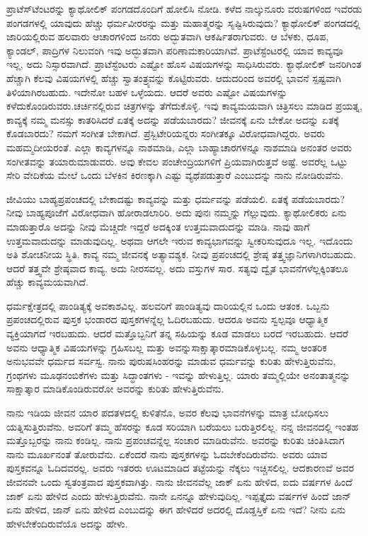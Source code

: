 ಪ್ರಾಟೆಸ್‌ಟೆಂಟರನ್ನು ಕ್ಯಾಥೋಲಿಕ್ ಪಂಗಡದೊಂದಿಗೆ ಹೋಲಿಸಿ ನೋಡಿ. ಕಳೆದ ನಾಲ್ಕುನೂರು ವರುಷಗಳಿಂದ ಇವೆರಡು ಪಂಗಡಗಳಲ್ಲಿ ಯಾವುದು ಹೆಚ್ಚು ಧರ್ಮವೀರರನ್ನು ಮತ್ತು ಮಹಾತ್ಮರನ್ನು ಸೃಷ್ಟಿಸಿರುವುದು? ಕ್ಯಾಥೋಲಿಕ್ ಪಂಗಡದಲ್ಲಿ ಜಾರಿಯಲ್ಲಿರುವ ಹಲವಾರು ಆಚಾರಗಳಿಂದ ಜನರು ಅದ್ಭುತವಾಗಿ ಆಕರ್ಷಿತರಾಗುವರು. ಆ ಬೆಳಕು, ಧೂಪ, ಕ್ಯಾಂಡಲ್, ಪಾದ್ರಿಗಳ ನಿಲುವಂಗಿ ಇವು ಅದ್ಭುತವಾಗಿ ಪರಿಣಾಮಕಾರಿಯಾಗಿವೆ. ಪ್ರಾಟೆಸ್ಟೆಂಟರಲ್ಲಿ ಯಾವ ಕಾವ್ಯವೂ ಇಲ್ಲ, ಅದು ನಿಸ್ಸಾರವಾಗಿದೆ. ಪ್ರಾಟೆಸ್ಟೆಂಟರು ಎಷ್ಟೋ ಹೊಸ ವಿಷಯಗಳನ್ನು ಸಾಧಿಸಿರುವರು. ಕ್ಯಾಥೋಲಿಕ್ ಜನರಿಗಿಂತ ಹೆಚ್ಚಾಗಿ ಕೆಲವು ವಿಷಯಗಳಲ್ಲಿ ಹೆಚ್ಚು ಸ್ವಾತಂತ್ರ್ಯವನ್ನು ಕೊಟ್ಟಿರುವರು. ಆದುದರಿಂದ ಅವರಲ್ಲಿ ಭಾವನೆ ಸ್ಪಷ್ಟವಾಗಿ ತಿಳಿಯಾಗಿರಬಹುದು. ಇದೇನೋ ಬಹಳ ಒಳ್ಳೆಯದು. ಆದರೆ ಅವರು ಎಷ್ಟೋ ವಿಷಯಗಳನ್ನು ಕಳೆದುಕೊಂಡಿರುವರು.\break ಚರ್ಚಿನಲ್ಲಿರುವ ಚಿತ್ರಗಳನ್ನು ತೆಗೆದುಕೊಳ್ಳಿ. ಇವು ಕಾವ್ಯಮಯವಾಗಿ ಚಿತ್ರಿಸಲು ಮಾಡಿದ ಪ್ರಯತ್ನ, ಕಾವ್ಯಕ್ಕೆ ನಮ್ಮ ಮನಸ್ಸು ಕಾತರಿಸಿದರೆ ಏತಕ್ಕೆ ಅದನ್ನು ಪಡೆಯಬಾರದು? ಜೀವನಕ್ಕೆ ಏನು ಬೇಕೋ ಅದನ್ನು ಏತಕ್ಕೆ ಕೊಡಬಾರದು? ನಮಗೆ ಸಂಗೀತ ಬೇಕಾಗಿದೆ. ಪ್ರೆಸ್ಬಿಟೇರಿಯನ್ನರು ಸಂಗೀತಕ್ಕೂ ವಿರೋಧವಾಗಿದ್ದರು. ಅವರು ಮಹಮ್ಮದೀಯರಂತೆ. ಎಲ್ಲಾ ಕಾವ್ಯಗಳನ್ನೂ ನಾಶಮಾಡಿ, ಎಲ್ಲಾ ಬಾಹ್ಯಾಚಾರಗಳನ್ನೂ ನಾಶಮಾಡಿ ಅನಂತರ ಅವರು ಸಂಗೀತವನ್ನು ತಯಾರುಮಾಡುವರು. ಅವು ಕೇವಲ ಪಂಚೇಂದ್ರಿಯಗಳಿಗೆ ಪ್ರಿಯವಾಗಿರುತ್ತವೆ ಅಷ್ಟೆ. ಅವರೆಲ್ಲ ಒಟ್ಟು ಸೇರಿ ವೇದಿಕೆಯ ಮೇಲೆ ಒಂದು ಬೆಳಕಿನ ಕಿರಣಕ್ಕಾಗಿ ಎಷ್ಟು ವ್ಯಥೆಪಡುತ್ತಾರೆ ಎಂಬುದನ್ನು ನಾನು ನೋಡಿರುವೆನು.

ಜೀವಿಯು ಬಾಹ್ಯಪ್ರಪಂಚದಲ್ಲಿ ಬೇಕಾದಷ್ಟು ಕಾವ್ಯವನ್ನು ಮತ್ತು ಧರ್ಮವನ್ನು ಪಡೆಯಲಿ. ಏತಕ್ಕೆ ಪಡೆಯಬಾರದು? ನೀವು ಬಾಹ್ಯಪೂಜೆಗೆ ವಿರೋಧವಾಗಿ ಹೋರಾಡಲಾರಿರಿ. ಅದು ಪುನಃ ನಮ್ಮನ್ನು ಗೆಲ್ಲುವುದು. ಕ್ಯಾಥೋಲಿಕರು ಏನು ಮಾಡುತ್ತಾರೊ ಅದನ್ನು ನೀವು ಮೆಚ್ಚದೇ ಇದ್ದರೆ ಅದಕ್ಕಿಂತ ಉತ್ತಮವಾದುದನ್ನು ಮಾಡಿ. ನಾವು ಹಾಗೆ ಉತ್ತಮವಾದುದನ್ನು ಮಾಡುವುದಿಲ್ಲ. ಅಥವಾ ಆಗಲೇ ಇರುವ ಕಾವ್ಯಭಾಗವನ್ನು ಸ್ವೀಕರಿಸುವುದೂ ಇಲ್ಲ. ಇದೊಂದು ಅತಿ ಶೋಚನೀಯ ಸ್ಥಿತಿ. ಕಾವ್ಯ ನಮ್ಮ ಜೀವನಕ್ಕೆ ಅತ್ಯಾವಶ್ಯಕ. ನೀವು ಪ್ರಪಂಚದಲ್ಲಿ ಶ್ರೇಷ್ಠ ತತ್ತ್ವಜ್ಞಾನಿಗಳಾಗಿರಬಹುದು. ಆದರೆ ತತ್ತ್ವವೇ ಶ್ರೇಷ್ಠವಾದ ಕಾವ್ಯ. ಅದು ನೀರಸವಲ್ಲ. ಅದು ವಸ್ತುಗಳ ಸಾರ. ಸತ್ಯವು ದ್ವೈತ ಭಾವನೆಗಳೆಲ್ಲಕ್ಕಿಂತಲೂ ಹೆಚ್ಚು ಕಾವ್ಯಮಯವಾಗಿದೆ.

ಧರ್ಮಕ್ಷೇತ್ರದಲ್ಲಿ ಪಾಂಡಿತ್ಯಕ್ಕೆ ಅವಕಾಶವಿಲ್ಲ. ಹಲವರಿಗೆ ಪಾಂಡಿತ್ಯವು ದಾರಿಯಲ್ಲಿನ ಒಂದು ಆತಂಕ. ಒಬ್ಬನು ಪ್ರಪಂಚದಲ್ಲಿರುವ ಪುಸ್ತಕ ಭಂಡಾರದ ಪುಸ್ತಕಗಳನ್ನೆಲ್ಲ ಓದಿರಬಹುದು. ಆದರೂ ಅವನು ಸ್ವಲ್ಪವೂ ಆಧ್ಯಾತ್ಮಿಕ ವ್ಯಕ್ತಿಯಾಗದೆ ಇರಬಹುದು. ಆದರೆ ಮತ್ತೊಬ್ಬನಿಗೆ ತನ್ನ ಸಹಿಯನ್ನು ಕೂಡ ಮಾಡಲು ಬರದೆ ಇರಬಹುದು. ಆದರೆ ಅವನು ಆಧ್ಯಾತ್ಮಿಕ ವಿಷಯಗಳನ್ನು ಗ್ರಹಿಸಬಲ್ಲ ಮತ್ತು ಅವನ್ನು\break ಸಾಕ್ಷಾತ್ಕಾರಮಾಡಿಕೊಳ್ಳಬಲ್ಲ. ನಮ್ಮ ಆಂತರಿಕ ಅನುಭವವೇ ಧರ್ಮದ ಸರ್ವಸ್ವ. ನಾನು ಪುರುಷಸಿಂಹರನ್ನು ಮಾಡುವ ಧರ್ಮವನ್ನು ಕುರಿತು ಹೇಳುತ್ತಿರುವೆನು, ಗ್ರಂಥಗಳು ಮೂಢನಂಬಿಕೆಗಳು ಮತ್ತು ಸಿದ್ಧಾಂತಗಳು - ಇವನ್ನು ಹೇಳುತ್ತಿಲ್ಲ. ಯಾರು ತಮ್ಮಲ್ಲಿಯೇ ಅನಂತಾತ್ಮನನ್ನು ಸಾಕ್ಷಾತ್ಕಾರ ಮಾಡಿಕೊಂಡಿರುವರೋ ಅವರನ್ನು ಕುರಿತು ಹೇಳುತ್ತಿರುವೆನು.

ನಾನು ಇಡಿಯ ಜೀವನ ಯಾರ ಪದತಳದಲ್ಲಿ ಕುಳಿತೆನೊ, ಅವರ ಕೆಲವು ಭಾವನೆಗಳನ್ನು ಮಾತ್ರ ಬೋಧಿಸಲು ಯತ್ನಿಸುತ್ತಿರುವೆನು. ಅವರಿಗೆ ತಮ್ಮ ಹೆಸರನ್ನು ಕೂಡ ಸರಿಯಾಗಿ ಬರೆಯಲು ಬರುತ್ತಿರಲಿಲ್ಲ. ನನ್ನ ಜೀವನದಲ್ಲಿ ಇಂತಹ ಮತ್ತೊಬ್ಬರನ್ನು ನಾನು ಕಂಡಿಲ್ಲ. ನಾನು ಪ್ರಪಂಚವನ್ನೆಲ್ಲ ಸಂಚಾರ ಮಾಡಿರುವೆನು. ಅವರನ್ನು ಕುರಿತು ಚಿಂತಿಸಿದಾಗ ನಾನು ಮೂರ್ಖನಂತೆ ತೋರುವೆನು. ಏಕೆಂದರೆ ನಾನು ಪುಸ್ತಕಗಳನ್ನು ಓದಬೇಕೆಂದಿರುವೆನು. ಅವರು ಯಾವ ಪುಸ್ತಕವನ್ನೂ ಓದಿದವರಲ್ಲ. ಅವರು ಇತರರು ಊಟಮಾಡಿದ ತಟ್ಟೆಯನ್ನು ನೆಕ್ಕಲು ಇಚ್ಚಿಸಲಿಲ್ಲ. ಆದಕಾರಣವೆ ಅವರ ಜೀವನವೇ ಒಂದು ಸ್ವತಂತ್ರವಾದ ಪುಸ್ತಕವಾಗಿತ್ತು. ನಾನು ಜೀವನವೆಲ್ಲ ಜಾಕ್ ಏನು ಹೇಳಿದ, ಐದು ವರ್ಷಗಳ ಹಿಂದೆ ಜಾಕ್ ಏನು ಹೇಳಿದ ಎಂದು ಹೇಳುತ್ತಿರುವೆನು. ನಾನೇ ಏನನ್ನೂ ಹೇಳುವುದಿಲ್ಲ. ಇಪ್ಪತ್ತೈದು ವರ್ಷಗಳ ಹಿಂದೆ ಜಾನ್ ಏನು ಹೇಳಿದ, ಜಾನ್ ಏನು ಹೇಳಿದ ಎಂಬುದನ್ನು ಈಗ ಹೇಳಿದರೆ ಅದರಲ್ಲಿ ದೊಡ್ಡಸ್ತಿಕೆ ಏನು ಇದೆ? ನೀನು ಏನು ಹೇಳಬೇಕೆಂದಿರುವೆಯೊ ಅದನ್ನು ಹೇಳು.

